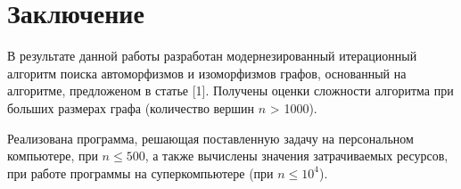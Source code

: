 \section*{Заключение}
\label{sec:Conclusion} 
\large

В результате данной работы разработан модернезированный итерационный алгоритм поиска автоморфизмов и изоморфизмов графов, основанный на алгоритме, предложеном в статье [1]. Получены оценки сложности алгоритма при больших размерах графа (количество вершин $n$ > 1000).

Реализована программа, решающая поставленную задачу на персональном компьютере, при $n \leq  500$, а также вычислены значения затрачиваемых ресурсов, при работе программы на суперкомпьютере (при $n \leq 10^4$).